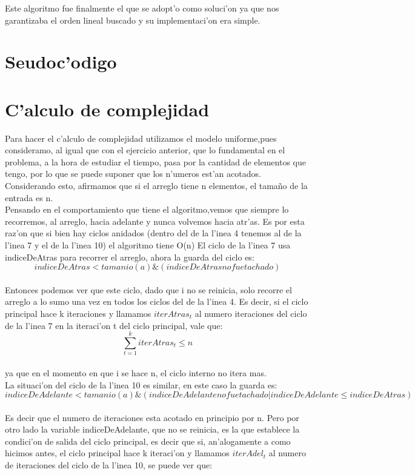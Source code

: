 Este algoritmo fue finalmente el que se adopt'o como soluci'on ya que nos garantizaba el orden lineal buscado y su implementaci'on 
era simple.

\section{Seudoc'odigo}


\section{C'alculo de complejidad}
Para hacer el c'alculo de complejidad utilizamos el modelo uniforme,pues consideramo, al igual que con el ejercicio anterior, que lo fundamental en el problema, a la hora de estudiar el tiempo, pasa por la cantidad de elementos que tengo, por lo que se puede suponer que los n'umeros est'an acotados. \\
Considerando esto, afirmamos que si el arreglo tiene n  elementos, el tama\~{n}o de la entrada es n.\\
Pensando en el comportamiento que tiene el algoritmo,vemos que siempre lo recorremos, al arreglo, hacia adelante y nunca volvemos hacia atr'as. Es por esta raz'on que si bien hay ciclos anidados (dentro del de la l'inea 4 tenemos al de la l'inea 7 y el de la l'inea 10) el algoritmo tiene O(n)
El ciclo de la l'inea 7 usa indiceDeAtras para recorrer el arreglo, ahora la guarda del ciclo es:\\
$$indiceDeAtras < tamanio(a) \& (indiceDeAtras no fue tachado)$$\\ 
Entonces podemos ver que este ciclo, dado que i no se reinicia, solo recorre el arreglo a lo sumo una vez en todos los ciclos del de la l'inea 4. Es decir, si el ciclo principal hace k iteraciones y llamamos $iterAtras_t$ al numero iteraciones del ciclo de la l'inea 7 en la iteraci'on t del ciclo principal, vale que:\\
$$\sum_{t=1}^{k}iterAtras_t \leq n$$\\
ya que en el momento en que i se hace n, el ciclo interno no itera mas.\\
La situaci'on del ciclo de la l'inea 10 es similar, en este caso la guarda es:\\
$$indiceDeAdelante < tamanio(a) \& (indiceDeAdelante no fue tachado | indiceDeAdelante \leq indiceDeAtras)$$\\
Es decir que el numero de iteraciones esta acotado en principio por n. Pero por otro lado la variable indiceDeAdelante, que no se reinicia, es la que establece la condici'on de salida del ciclo principal, es decir que si, an'alogamente a como hicimos antes, el ciclo principal hace k iteraci'on y llamamos $iterAdel_t$ al numero de iteraciones del ciclo de la l'inea 10, se puede ver que:\\
